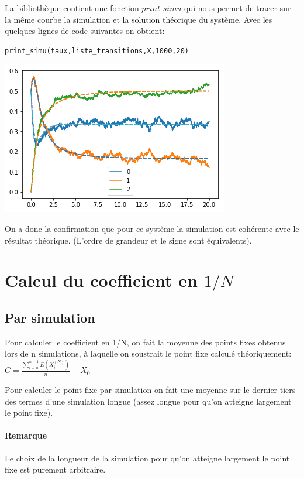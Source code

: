 \documentclass[a4paper,12pt]{report}
\def\D{\displaystyle}
\begin{document}
La bibliothèque contient une fonction $print\_simu$ qui nous permet de tracer sur la même courbe la
simulation et la solution théorique du système.
Avec les quelques lignes de code suivantes on obtient:

\begin{lstlisting}[frame=single]
  print_simu(taux,liste_transitions,X,1000,20)
\end{lstlisting}

\begin{center}
  \includegraphics{figure2.png}
\end{center}

On a donc la confirmation que pour ce système la simulation est
cohérente avec le résultat théorique. (L'ordre de grandeur et le signe
sont équivalents).

\section{Calcul du coefficient en $1/N$}

\subsection{Par simulation}

Pour calculer le coefficient en 1/N, on fait la moyenne des
points fixes obtenus lors de n simulations, à laquelle on soustrait le point fixe calculé théoriquement: $\D C =
\frac{\sum_{i=0}^{n-1}{E(X^{(N)}_i)}}{n}-X_0 \ $

Pour calculer le point fixe par simulation on fait une moyenne sur le
dernier tiers des termes d'une simulation longue (assez longue pour
qu'on atteigne largement le point fixe).

\paragraph{Remarque}
Le choix de la longueur de la simulation pour qu'on atteigne largement
le point fixe est purement arbitraire. \\
\end{document}
